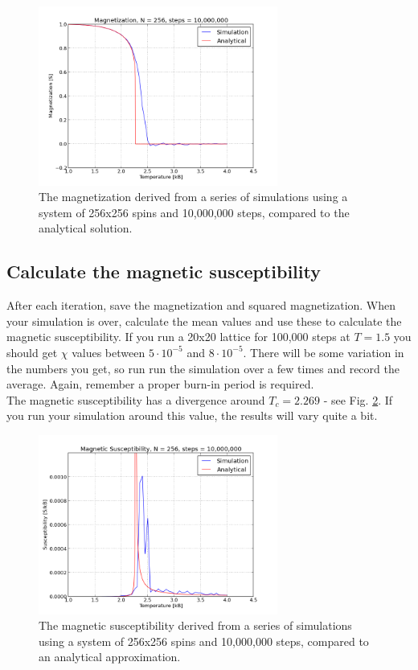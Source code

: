 \documentclass{article}
\begin{document}
\begin{figure}[p]
  \centering
  \includegraphics[width=0.7\textwidth]{mag_anal.png}
  \caption{The magnetization derived from a series of simulations using a system of
  256x256 spins and 10,000,000 steps, compared to the analytical solution.}
  \label{fig:magnetization}
\end{figure}


\subsection{Calculate the magnetic susceptibility}

After each iteration, save the magnetization and squared magnetization.
When your simulation is over, calculate the mean values and use these to
calculate the magnetic susceptibility.
If you run a 20x20 lattice for 100,000 steps
at $T = 1.5$ you should get $\chi$ values
between $5 \cdot 10^{-5}$ and $8 \cdot 10^{-5}$.
There will be some variation in the numbers you get,
so run run the simulation over a few times and record the average.
Again, remember a proper burn-in period is required.\\

The magnetic susceptibility has a divergence around $T_c = 2.269$ - see Fig.
\ref{fig:susceptibility}.
If you run your simulation around this value,
the results will vary quite a bit.


\begin{figure}[htb]
  \centering
  \includegraphics[width=0.7\textwidth]{xi_anal.png}
  \caption{The magnetic susceptibility derived from a series of simulations using a
  system of 256x256 spins and 10,000,000 steps, compared to an analytical approximation.}
  \label{fig:susceptibility}
\end{figure}
\end{document}
